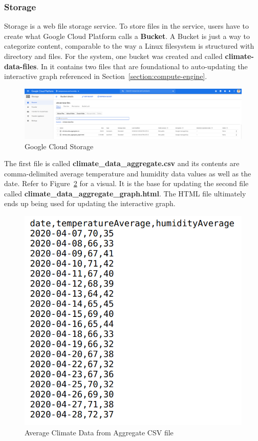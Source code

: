 \documentclass{article}
\begin{document}
\subsubsection{Storage}
Storage is a web file storage service. To store files in the service, users have to create what Google Cloud Platform calls a \textbf{Bucket}. A Bucket is just a way to categorize content, comparable to the way a Linux filesystem is structured with directory and files. For the system, one bucket was created and called \textbf{climate-data-files}. In it contains two files that are foundational to auto-updating the interactive graph referenced in Section~\ref{section:compute-engine}.

\begin{figure}[H]
	\center
	\includegraphics[width=\textwidth]{images/storage.png}
	\caption{Google Cloud Storage}
	\label{fig:storage}
\end{figure}

The first file is called \textbf{climate\_data\_aggregate.csv} and its contents are comma-delimited average temperature and humidity data values as well as the date. Refer to Figure~\ref{fig:climate-data} for a visual. It is the base for updating the second file called \textbf{climate\_data\_aggregate\_graph.html}. The HTML file ultimately ends up being used for updating the interactive graph.

\begin{figure}[H]
	\center
	\includegraphics[width=.6\textwidth]{images/climate-data-csv.png}
	\caption{Average Climate Data from Aggregate CSV file}
	\label{fig:climate-data}
\end{figure}
\end{document}
